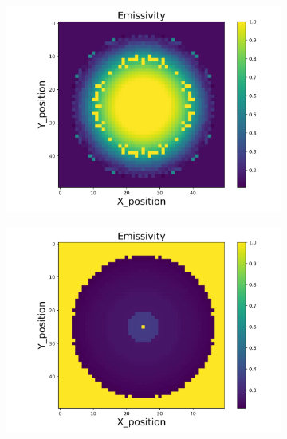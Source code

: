 \begin{figure}[p]
    \centering
    \begin{minipage}{\textwidth}
        \centering
        \begin{subfigure}{0.325\textwidth}
            \centering
            \includegraphics[width=\textwidth]{figures/raw_data/0/lin_square/emi_cal.jpg}
        \end{subfigure}
        \begin{subfigure}{0.325\textwidth}
            \centering
            \includegraphics[width=\textwidth]{figures/raw_data/5/lin_square/emi_cal.jpg}
        \end{subfigure}

\end{minipage}
\end{figure}

